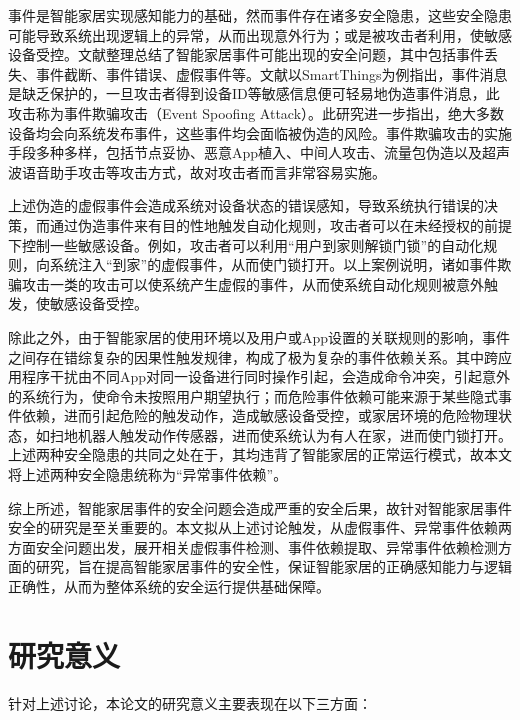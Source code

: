事件是智能家居实现感知能力的基础，然而事件存在诸多安全隐患，这些安全隐患可能导致系统出现逻辑上的异常，从而出现意外行为；或是被攻击者利用，使敏感设备受控。文献\cite{fu_hawatcher_2021}整理总结了智能家居事件可能出现的安全问题，其中包括事件丢失、事件截断、事件错误、虚假事件等。文献\cite{fernandes_security_2016}以SmartThings为例指出，事件消息是缺乏保护的，一旦攻击者得到设备ID等敏感信息便可轻易地伪造事件消息，此攻击称为事件欺骗攻击（Event Spoofing Attack）。此研究进一步指出，绝大多数设备均会向系统发布事件，这些事件均会面临被伪造的风险。事件欺骗攻击的实施手段多种多样，包括节点妥协、恶意App植入、中间人攻击、流量包伪造以及超声波语音助手攻击等攻击方式，故对攻击者而言非常容易实施。

上述伪造的虚假事件会造成系统对设备状态的错误感知，导致系统执行错误的决策，而通过伪造事件来有目的性地触发自动化规则，攻击者可以在未经授权的前提下控制一些敏感设备。例如，攻击者可以利用“用户到家则解锁门锁”的自动化规则，向系统注入“到家”的虚假事件，从而使门锁打开。以上案例说明，诸如事件欺骗攻击一类的攻击可以使系统产生虚假的事件，从而使系统自动化规则被意外触发，使敏感设备受控。

除此之外，由于智能家居的使用环境以及用户或App设置的关联规则的影响，事件之间存在错综复杂的因果性触发规律，构成了极为复杂的事件依赖关系。其中跨应用程序干扰由不同App对同一设备进行同时操作引起，会造成命令冲突，引起意外的系统行为，使命令未按照用户期望执行；而危险事件依赖可能来源于某些隐式事件依赖，进而引起危险的触发动作，造成敏感设备受控，或家居环境的危险物理状态，如扫地机器人触发动作传感器，进而使系统认为有人在家，进而使门锁打开。上述两种安全隐患的共同之处在于，其均违背了智能家居的正常运行模式，故本文将上述两种安全隐患统称为“异常事件依赖”。

综上所述，智能家居事件的安全问题会造成严重的安全后果，故针对智能家居事件安全的研究是至关重要的。本文拟从上述讨论触发，从虚假事件、异常事件依赖两方面安全问题出发，展开相关虚假事件检测、事件依赖提取、异常事件依赖检测方面的研究，旨在提高智能家居事件的安全性，保证智能家居的正确感知能力与逻辑正确性，从而为整体系统的安全运行提供基础保障。

\section{研究意义}

针对上述讨论，本论文的研究意义主要表现在以下三方面：

